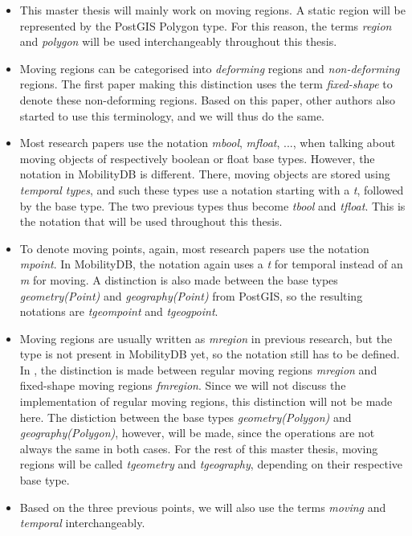 \begin{itemize}
    \item This master thesis will mainly work on moving regions. A static region will be represented by the PostGIS Polygon type. For this reason, the terms \textit{region} and \textit{polygon} will be used interchangeably throughout this thesis.

    \item Moving regions can be categorised into \textit{deforming} regions and \textit{non-deforming} regions. The first paper making this distinction uses the term \textit{fixed-shape} to denote these non-deforming regions. Based on this paper, other authors  also started to use this terminology, and we will thus do the same.

    \item Most research papers use the notation \textit{mbool}, \textit{mfloat}, ..., when talking about moving objects of respectively boolean or float base types. However, the notation in MobilityDB is different. There, moving objects are stored using \textit{temporal types}, and such these types use a notation starting with a \textit{t}, followed by the base type. The two previous types thus become \textit{tbool} and \textit{tfloat}. This is the notation that will be used throughout this thesis.

    \item To denote moving points, again, most research papers use the notation \textit{mpoint}. In MobilityDB, the notation again uses a \textit{t} for temporal instead of an \textit{m} for moving. A distinction is also made between the base types \textit{geometry(Point)} and \textit{geography(Point)} from PostGIS, so the resulting notations are \textit{tgeompoint} and \textit{tgeogpoint}.

    \item Moving regions are usually written as \textit{mregion} in previous research, but the type is not present in MobilityDB yet, so the notation still has to be defined. In , the distinction is made between regular moving regions \textit{mregion} and fixed-shape moving regions \textit{fmregion}. Since we will not discuss the implementation of regular moving regions, this distinction will not be made here. The distiction between the base types \textit{geometry(Polygon)} and \textit{geography(Polygon)}, however, will be made, since the operations are not always the same in both cases. For the rest of this master thesis, moving regions will be called \textit{tgeometry} and \textit{tgeography}, depending on their respective base type.

    \item Based on the three previous points, we will also use the terms \textit{moving} and \textit{temporal} interchangeably.
\end{itemize}